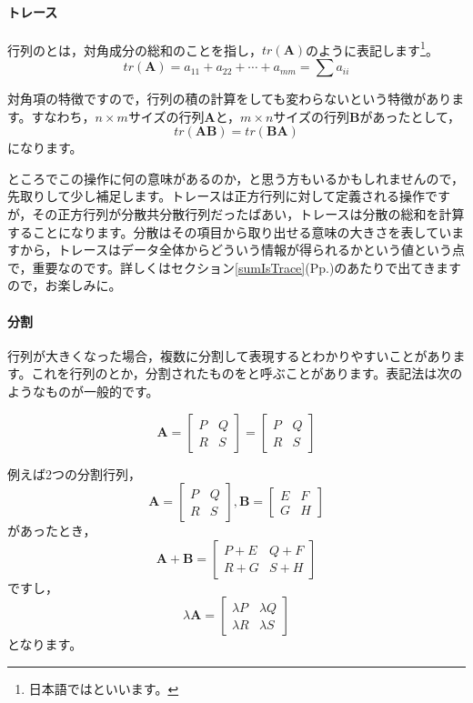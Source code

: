 \documentclass{ltjsbook}
\begin{document}
\paragraph{トレース}
\label{defineOfTrace}
行列のとは，対角成分の総和のことを指し，$tr(\bm{A})$のように表記します\footnote{日本語ではといいます。}。
\[ tr(\bm{A}) = a_{11} + a_{22} + \cdots + a_{mm} = \sum a_{ii}\]

対角項の特徴ですので，行列の積の計算をしても変わらないという特徴があります。すなわち，$n \times m$サイズの行列$\bm{A}$と，$m \times n$サイズの行列$\bm{B}$があったとして，
\[ tr(\bm{AB}) = tr(\bm{BA}) \]
になります。

ところでこの操作に何の意味があるのか，と思う方もいるかもしれませんので，先取りして少し補足します。トレースは正方行列に対して定義される操作ですが，その正方行列が分散共分散行列だったばあい，トレースは分散の総和を計算することになります。分散はその項目から取り出せる意味の大きさを表していますから，トレースはデータ全体からどういう情報が得られるかという値という点で，重要なのです。詳しくはセクション\ref{sumIsTrace}(Pp.\pageref{sumIsTrace})のあたりで出てきますので，お楽しみに。
\paragraph{分割}
行列が大きくなった場合，複数に分割して表現するとわかりやすいことがあります。これを行列のとか，分割されたものをと呼ぶことがあります。表記法は次のようなものが一般的です。

\[
	\bm{A} = \begin{bmatrix} P & Q \\ R & S \end{bmatrix} = \left[ \begin{array}{c|c} P & Q \\ \hline R & S \end{array} \right]
\]

例えば2つの分割行列，
\[ \bm{A} = \begin{bmatrix} P & Q \\ R & S \end{bmatrix}, \bm{B} = \begin{bmatrix} E & F \\ G & H \end{bmatrix} \]
があったとき，
\[ \bm{A} + \bm{B} = \begin{bmatrix} P  + E & Q + F \\ R + G & S + H \end{bmatrix} \]
ですし，
\[ \lambda\bm{A} = \begin{bmatrix} \lambda P & \lambda Q \\ \lambda R & \lambda S\end{bmatrix}\]
となります。
\end{document}
